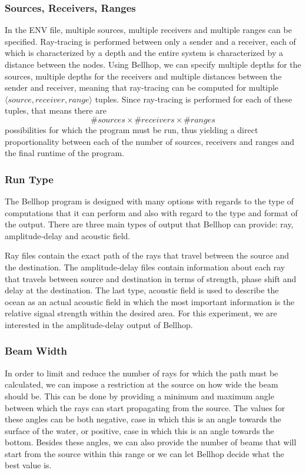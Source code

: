 \documentclass[a4paper]{IEEEtran}
\begin{document}
\subsubsection{Sources, Receivers, Ranges}
In the ENV file, multiple sources, multiple receivers and multiple
ranges can be specified. Ray-tracing is performed between only a
sender and a receiver, each of which is characterized by a depth and
the entire system is characterized by a distance between the
nodes. Using Bellhop, we can specify multiple depths for the sources,
multiple depths for the receivers and multiple distances between the
sender and receiver, meaning that ray-tracing can be computed
for multiple $\langle source,receiver,range \rangle$ tuples. Since
ray-tracing is performed for each of these tuples, that means there
are $$\#sources \times \#receivers \times \#ranges$$ possibilities for which the
program must be run, thus yielding a direct proportionality between each of
the number of sources, receivers and ranges and the final runtime of
the program.

\subsubsection{Run Type}
The Bellhop program is designed with many options with regards to the
type of computations that it can perform and also with regard to the
type and format of the output. There are three main types of output
that Bellhop can provide: ray, amplitude-delay and acoustic field.

Ray files contain the exact path of the rays that travel between the
source and the destination. The amplitude-delay files contain
information about each ray that travels between source and destination
in terms of strength, phase shift and delay at the destination. The
last type, acoustic field is used to describe the ocean as an actual
acoustic field in which the most important information is the relative
signal strength within the desired area. For this experiment, we are
interested in the amplitude-delay output of Bellhop.

\subsubsection{Beam Width}
In order to limit and reduce the number of rays for which the path
must be calculated, we can impose a restriction at the source on how
wide the beam should be. This can be done by providing a minimum and
maximum angle between which the rays can start propagating from the
source. The values for these angles can be both negative, case in
which this is an angle towards the surface of the water, or
positive, case in which this is an angle towards the bottom. Besides
these angles, we can also provide the number of beams that will start
from the source within this range or we can let Bellhop decide what
the best value is.
\end{document}
